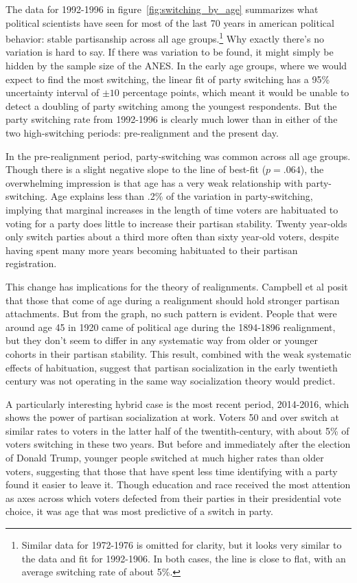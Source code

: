 \documentclass[11pt]{scrartcl}\usepackage[]{graphicx}\usepackage[]{color}
\begin{document}
The data for 1992-1996 in figure~\ref{fig:switching_by_age} summarizes what political scientists have seen for most of the last 70 years in american political behavior: stable partisanship across all age groups.\footnote{Similar data for 1972-1976 is omitted for clarity, but it looks very similar to the data and fit for 1992-1906. In both cases, the line is close to flat, with an average switching rate of about 5\%.} Why exactly there's no variation is hard to say. If there was variation to be found, it might simply be hidden by the sample size of the ANES. In the early age groups, where we would expect to find the most switching, the linear fit of party switching has a 95\% uncertainty interval of $\pm 10$ percentage points, which meant it would be unable to detect a doubling of party switching among the youngest respondents. But the party switching rate from 1992-1996 is clearly much lower than in either of the two high-switching periods: pre-realignment and the present day.

In the pre-realignment period, party-switching was common across all age groups. Though there is a slight negative slope to the line of best-fit ($p = .064$), the overwhelming impression is that age has a very weak relationship with party-switching. Age explains less than .2\% of the variation in party-switching, implying that marginal increases in the length of time voters are habituated to voting for a party does little to increase their partisan stability. Twenty year-olds only switch parties about a third more often than sixty year-old voters, despite having spent many more years becoming habituated to their partisan registration.

This change has implications for the theory of realignments.  Campbell et al \citeyearpar{campbell1960american} posit that those that come of age during a realignment should hold stronger partisan attachments. But from the graph, no such pattern is evident. People that were around age 45 in 1920 came of political age during the 1894-1896 realignment, but they don't seem to differ in any systematic way from older or younger cohorts in their partisan stability. This result, combined with the weak systematic effects of habituation, suggest that partisan socialization in the early twentieth century was not operating in the same way socialization theory would predict.

A particularly interesting hybrid case is the most recent period, 2014-2016, which shows the power of partisan socialization at work. Voters 50 and over switch at similar rates to voters in the latter half of the twentith-century, with about 5\% of voters switching in these two years. But before and immediately after the election of Donald Trump, younger people switched at much higher rates than older voters, suggesting that those that have spent less time identifying with a party found it easier to leave it. Though education and race received the most attention as axes across which voters defected from their parties in their presidential vote choice, it was age that was most predictive of a switch in party. 
\end{document}
